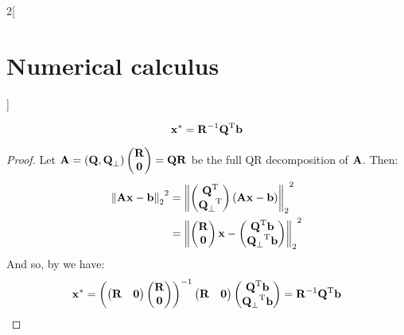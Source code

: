 \documentclass[../../../main_math.tex]{subfiles}
\begin{document}
\begin{multicols}{2}[\section{Numerical calculus}]
\begin{proposition}
    $$
      \boldsymbol{\mathrm{x}}^* = \boldsymbol{\mathrm{R}}^{-1}{\boldsymbol{\mathrm{Q}}}^{\mathrm{T}}\boldsymbol{\mathrm{b}}
    $$
  \end{proposition}
  \begin{proof}
    Let $\boldsymbol{\mathrm{A}}=(\boldsymbol{\mathrm{Q}}, \boldsymbol{\mathrm{Q}}_\perp)\begin{pmatrix}
        \boldsymbol{\mathrm{R}} \\
        \boldsymbol{\mathrm{0}}
      \end{pmatrix}= \boldsymbol{\mathrm{Q}}\boldsymbol{\mathrm{R}}$ be the full QR decomposition of $\boldsymbol{\mathrm{A}}$. Then:
    \begin{align*}
      {\left\|\boldsymbol{\mathrm{A}}\boldsymbol{\mathrm{x}}-\boldsymbol{\mathrm{b}}\right\|_2}^{2} & ={\left\|\begin{pmatrix}
                                                       {\boldsymbol{\mathrm{Q}}}^{\mathrm{T}} \\
                                                       {\boldsymbol{\mathrm{Q}}_\perp}^{\mathrm{T}}
                                                     \end{pmatrix}(\boldsymbol{\mathrm{Ax}}-\boldsymbol{\mathrm{b}})\right\|_2}^{2}                           \\
                                         & ={\left\|\begin{pmatrix}
                                                       \boldsymbol{\mathrm{R}} \\
                                                       \boldsymbol{\mathrm{0}}
                                                     \end{pmatrix}\boldsymbol{\mathrm{x}}-\begin{pmatrix}
                                                                           {\boldsymbol{\mathrm{Q}}}^{\mathrm{T}}\boldsymbol{\mathrm{b}} \\
                                                                           {\boldsymbol{\mathrm{Q}}_\perp}^{\mathrm{T}}\boldsymbol{\mathrm{b}}
                                                                         \end{pmatrix}\right\|_2}^{2}
    \end{align*}
    And so, by  we have:
    $$
      \boldsymbol{\mathrm{x}}^*={\left(\begin{pmatrix}
          \boldsymbol{\mathrm{R}} & \boldsymbol{\mathrm{0}}
        \end{pmatrix}\begin{pmatrix}
          \boldsymbol{\mathrm{R}} \\
          \boldsymbol{\mathrm{0}}
        \end{pmatrix}\right)}^{-1}\begin{pmatrix}
        \boldsymbol{\mathrm{R}} & \boldsymbol{\mathrm{0}}
      \end{pmatrix}\begin{pmatrix}
        {\boldsymbol{\mathrm{Q}}}^{\mathrm{T}}\boldsymbol{\mathrm{b}} \\
        {\boldsymbol{\mathrm{Q}}_\perp}^{\mathrm{T}}\boldsymbol{\mathrm{b}}
      \end{pmatrix}=\boldsymbol{\mathrm{R}}^{-1}{\boldsymbol{\mathrm{Q}}}^{\mathrm{T}}\boldsymbol{\mathrm{b}}
    $$
  \end{proof}
\end{multicols}
\end{document}
